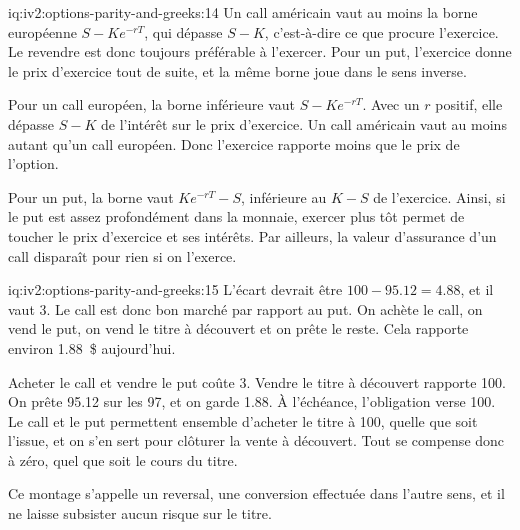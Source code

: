 \begin{solution}{iq:iv2:options-parity-and-greeks:14}
Un call américain vaut au moins la borne européenne $S - Ke^{-rT}$, qui dépasse $S - K$, c'est-à-dire ce que procure l'exercice. Le revendre est donc toujours préférable à l'exercer. Pour un put, l'exercice donne le prix d'exercice tout de suite, et la même borne joue dans le sens inverse.

Pour un call européen, la borne inférieure vaut $S - Ke^{-rT}$. Avec un $r$ positif, elle dépasse $S - K$ de l'intérêt sur le prix d'exercice. Un call américain vaut au moins autant qu'un call européen. Donc l'exercice rapporte moins que le prix de l'option.

Pour un put, la borne vaut $Ke^{-rT} - S$, inférieure au $K - S$ de l'exercice. Ainsi, si le put est assez profondément dans la monnaie, exercer plus tôt permet de toucher le prix d'exercice et ses intérêts. Par ailleurs, la valeur d'assurance d'un call disparaît pour rien si on l'exerce.

\end{solution}

\begin{solution}{iq:iv2:options-parity-and-greeks:15}
L'écart devrait être $100 - 95.12 = 4.88$, et il vaut 3. Le call est donc bon marché par rapport au put. On achète le call, on vend le put, on vend le titre à découvert et on prête le reste. Cela rapporte environ 1.88~\$ aujourd'hui.

Acheter le call et vendre le put coûte 3. Vendre le titre à découvert rapporte 100. On prête 95.12 sur les 97, et on garde 1.88. À l'échéance, l'obligation verse 100. Le call et le put permettent ensemble d'acheter le titre à 100, quelle que soit l'issue, et on s'en sert pour clôturer la vente à découvert. Tout se compense donc à zéro, quel que soit le cours du titre.

Ce montage s'appelle un reversal, une conversion effectuée dans l'autre sens, et il ne laisse subsister aucun risque sur le titre.

\end{solution}

